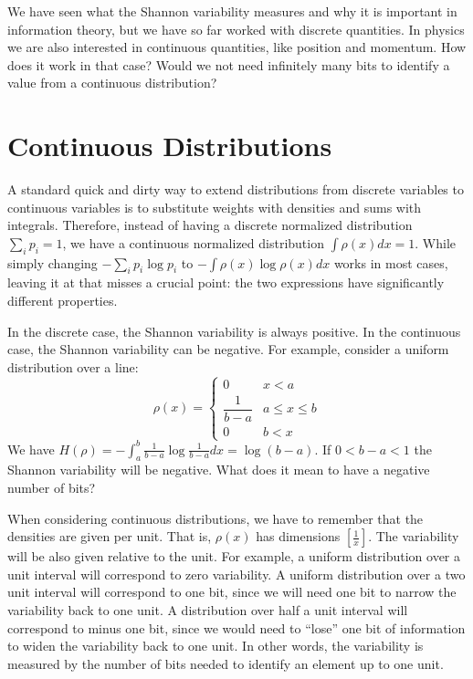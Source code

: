 \documentclass[iopart]{revtex4-1}
\begin{document}
We have seen what the Shannon variability measures and why it is important in information theory, but we have so far worked with discrete quantities. In physics we are also interested in continuous quantities, like position and momentum. How does it work in that case? Would we not need infinitely many bits to identify a value from a continuous distribution?

\section{Continuous Distributions}\label{sec_cont}

A standard quick and dirty way to extend distributions from discrete variables to continuous variables is to substitute weights with densities and sums with integrals. Therefore, instead of having a discrete normalized distribution $\sum_i p_i = 1$, we have a continuous normalized distribution $\int \rho(x)dx=1$. While simply changing $- \sum_i p_i \log p_i$ to $- \int \rho(x) \log \rho(x) dx$ works in most cases, leaving it at that misses a crucial point: the two expressions have significantly different properties.

In the discrete case, the Shannon variability is always positive. In the continuous case, the Shannon variability can be negative. For example, consider a uniform distribution over a line:
\begin{equation}
\rho(x)=
\begin{cases}
0 & x < a\\
\dfrac{1}{b-a} & a \leq x \leq b\\
0 & b < x
\end{cases}
\end{equation}
We have $H(\rho) = - \int_a^b \frac{1}{b-a} \log \frac{1}{b-a} dx = \log (b-a)$. If $0 < b-a < 1$ the Shannon variability will be negative. What does it mean to have a negative number of bits?

When considering continuous distributions, we have to remember that the densities are given per unit. That is, $\rho(x)$ has dimensions $[\frac{1}{x}]$. The variability will be also given relative to the unit. For example, a uniform distribution over a unit interval will correspond to zero variability. A uniform distribution over a two unit interval will correspond to one bit, since we will need one bit to narrow the variability back to one unit. A distribution over half a unit interval will correspond to minus one bit, since we would need to ``lose'' one bit of information to widen the variability back to one unit. In other words, the variability is measured by the number of bits needed to identify an element up to one unit.
\end{document}
